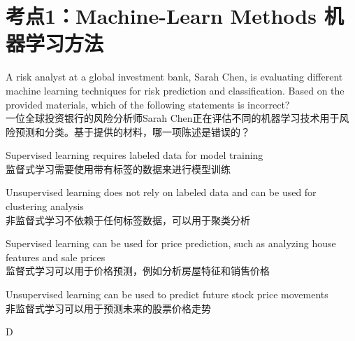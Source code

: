 \documentclass{article}
\newcounter{question} %
\begin{document}
 \tableofcontents %
\newpage


\section{考点1：Machine-Learn Methods 机器学习方法}
\setcounter{question}{0}


\begin{question}
A risk analyst at a global investment bank, Sarah Chen, is evaluating different machine learning techniques for risk prediction and classification. Based on the provided materials, which of the following statements is incorrect?\\
一位全球投资银行的风险分析师Sarah Chen正在评估不同的机器学习技术用于风险预测和分类。基于提供的材料，哪一项陈述是错误的？
\end{question}

\begin{choices}
    \item Supervised learning requires labeled data for model training\\
    监督式学习需要使用带有标签的数据来进行模型训练
    \item Unsupervised learning does not rely on labeled data and can be used for clustering analysis\\
    非监督式学习不依赖于任何标签数据，可以用于聚类分析
    \item Supervised learning can be used for price prediction, such as analyzing house features and sale prices\\
    监督式学习可以用于价格预测，例如分析房屋特征和销售价格
    \item Unsupervised learning can be used to predict future stock price movements\\
    非监督式学习可以用于预测未来的股票价格走势
\end{choices}

\begin{correctanswer}
D
\end{correctanswer}
\end{document}
